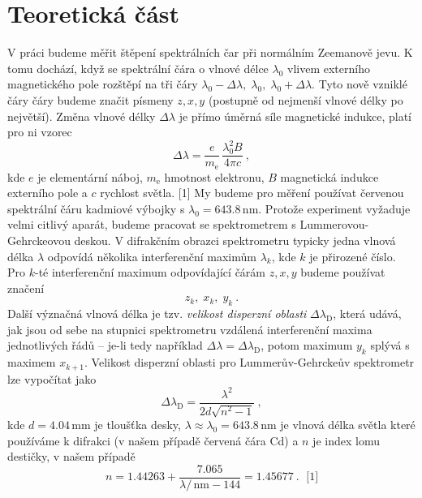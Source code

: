\documentclass[10pt,a4paper]{article}
\renewcommand{\U}[1]{\ensuremath{\,\mathrm{#1}}}
\newcommand{\°}{\degree}
\begin{document}
\section{Teoretická část}
V práci budeme měřit štěpení spektrálních čar při normálním Zeemanově jevu. K tomu dochází, když se spektrální čára o vlnové délce $\lambda_0$ vlivem externího magnetického pole rozštěpí na tři čáry $\lambda_0 - \Delta\lambda, \; \lambda_0, \; \lambda_0 + \Delta\lambda$. Tyto nově vzniklé čáry čáry budeme značit písmeny $z, x, y$ (postupně od nejmenší vlnové délky po největší). Změna vlnové délky $\Delta\lambda$ je přímo úměrná síle magnetické indukce, platí pro ni vzorec
\begin{equation}
    \Delta\lambda = \frac{e}{m_{\mathrm{e}}} \, \frac{\lambda_0^2 B}{4 \pi c} \: ,
    \label{eq-merny-naboj}
\end{equation}
kde $e$ je elementární náboj, $m_{\mathrm{e}}$ hmotnost elektronu, $B$ magnetická indukce externího pole a $c$ rychlost světla. [1] My budeme pro měření používat červenou spektrální čáru kadmiové výbojky s $\lambda_0=643.8 \U{nm}$. Protože experiment vyžaduje velmi citlivý aparát, budeme pracovat se spektrometrem s Lummerovou-Gehrckeovou deskou. V difrakčním obrazci spektrometru typicky jedna vlnová délka $\lambda$ odpovídá několika interferenční maximům $\lambda_k$,  kde $k$ je přirozené číslo. Pro $k$-té interferenční maximum odpovídající čárám $z,x,y$ budeme používat značení
\begin{equation*}
    z_k, \; x_k, \; y_k \: .
\end{equation*}
Další význačná vlnová délka je tzv. \textit{velikost disperzní oblasti} $\Delta\lambda_{\mathrm{D}}$, která udává, jak jsou od sebe na stupnici spektrometru vzdálená interferenční maxima jednotlivých řádů – je-li tedy například $\Delta\lambda = \Delta\lambda_{\mathrm{D}}$, potom maximum $y_k$ splývá s maximem $x_{k+1}$. Velikost disperzní oblasti pro Lummerův-Gehrckeův spektrometr lze vypočítat jako
\begin{equation*}
    \Delta\lambda_{\mathrm{D}} = \frac{\lambda^2}{2d\sqrt{n^2-1}} \: ,
\end{equation*}
kde $d=4.04 \U{mm}$ je tloušťka desky, $\lambda\approx\lambda_0=643.8 \U{nm}$ je vlnová délka světla které používáme k difrakci (v našem případě červená čára Cd) a $n$ je index lomu destičky, v našem případě
\begin{equation*}
    n = 1.44263 + \frac{7.065}{\lambda/\!\U{nm} - 144}
    = 1.45677 \: . \; \text{ [1]}
\end{equation*}
\end{document}
